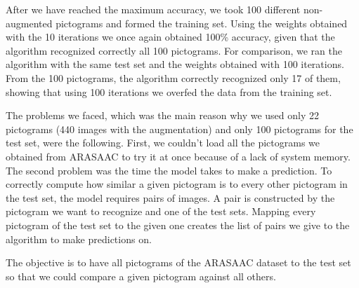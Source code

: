 After we have reached the maximum accuracy, we took 100 different non-augmented pictograms and formed the training set. Using the weights obtained with the 10 iterations we once again obtained 100\% accuracy, given that the algorithm recognized correctly all 100 pictograms. For comparison, we ran the algorithm with the same test set and the weights obtained with 100 iterations. From the 100 pictograms, the algorithm correctly recognized only 17 of them, showing that using 100 iterations we overfed the data from the training set.

The problems we faced, which was the main reason why we used only 22 pictograms (440 images with the augmentation) and only 100 pictograms for the test set, were the following. First, we couldn't load all the pictograms we obtained from ARASAAC to try it at once because of a lack of system memory. The second problem was the time the model takes to make a prediction. To correctly compute how similar a given pictogram is to every other pictogram in the test set, the model requires pairs of images. A pair is constructed by the pictogram we want to recognize and one of the test sets. Mapping every pictogram of the test set to the given one creates the list of pairs we give to the algorithm to make predictions on.

The objective is to have all pictograms of the ARASAAC dataset to the test set so that we could compare a given pictogram against all others.




